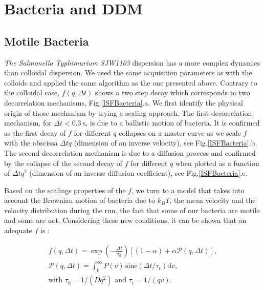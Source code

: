 \documentclass[%
 aip,
 jmp,%
 amsmath,amssymb,
reprint,%
]{revtex4-1}
\newcommand{\tg}[1]{{\color{magenta}#1}} %
\begin{document}
\section{Bacteria and DDM}
\label{sec:BactSection}

\subsection{Motile Bacteria}

\tg{\textit{The Salmonella Typhimurium SJW1103} dispersion has a more complex dynamics than colloidal dispersion.} We used the same acquisition parameters as with the colloids and applied the same algorithm as the one presented above. Contrary to the colloidal case, $f(q, \Delta t)$ shows a two step decay which corresponds to two decorrelation mechanisms, Fig.\ref{ISFBacteria}.a. We first identify the physical origin of those mechanism by trying a scaling approach. The first decorrelation mechanism, for $\Delta t < \SI{0.3}{\second}$, is due to a ballistic motion of bacteria. It is confirmed as the first decay of $f$  for different $q$  collapses on a master curve as we scale $f$ with the abscissa  $\Delta t q$ (dimension of an inverse velocity), see Fig.\ref{ISFBacteria}.b. The second decorrelation mechanism is due to a diffusion process and confirmed by the collapse of the second decay of $f$ for different $q$ when plotted as a function of $\Delta t q^2$ (dimension of an inverse diffusion coefficient), see Fig.\ref{ISFBacteria}.c.

Based on the scalings properties of the $f$, we turn to a model that takes into account \tg{the Brownian motion of bacteria due to $k_BT$, the mean velocity and the velocity distribution during the run, the fact that some of our bacteria are motile and some are not. Considering these new conditions, it can be shown that an adequate $f$ is \citep{1_BactMobil}}:

\begin{multline}
f(q, \Delta t) = \exp\left(-\frac{\Delta t}{\tau_\text{d}}\right)\left[(1-\alpha) + \alpha \mathcal{P}(q, \Delta t)\right],\\
\mathcal{P}(q, \Delta t) = \int_{0}^{\infty} P(v)\, \text{sinc}(\Delta t/\tau_\text{r}) \mathrm{d}v, \\
\text{with }\tau_\text{d} = 1/(Dq^2) \text{ and } \tau_\text{r}=1/(q\overline{v}).
\label{eq:fbact}
\end{multline}
\end{document}
